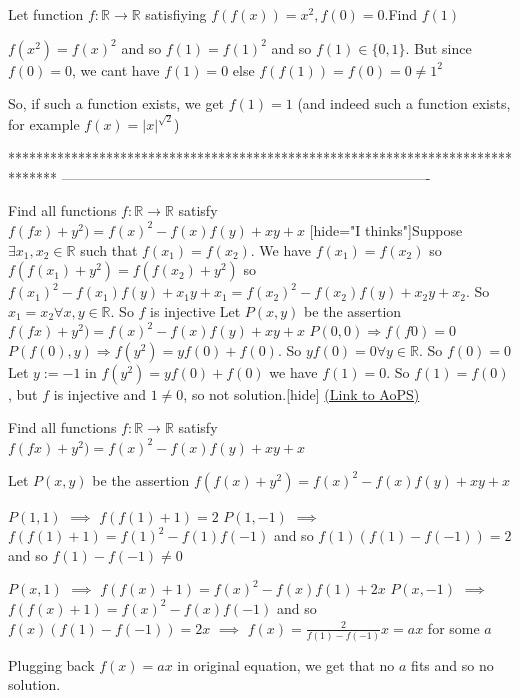 \begin{solution}
	\begin{tcolorbox}Let function $f: \mathbb{R}\to\mathbb{R}$ satisfiying $f(f(x))=x^2,
f(0)=0$.Find $f(1)$\end{tcolorbox}

$f(x^2)=f(x)^2$ and so $f(1)=f(1)^2$ and so $f(1)\in\{0,1\}$. But since $f(0)=0$, we cant have $f(1)=0$ else $f(f(1))=f(0)=0\ne 1^2$

So, if such a function exists, we get $\boxed{f(1)=1}$  (and indeed such a function exists, for example $f(x)=|x|^{\sqrt 2}$)
\end{solution}
*******************************************************************************
-------------------------------------------------------------------------------

\begin{problem}
	Find all functions $f:\mathbb{R}\rightarrow \mathbb{R}$ satisfy
$f(fx)+y^2)=f(x)^2-f(x)f(y)+xy+x$
[hide="I thinks"]Suppose $\exists x_{1}, x_{2}\in \mathbb{R}$ such that $f(x_{1})=f(x_{2})$. 
We have $f(x_{1})=f(x_{2})$ so $f(f(x_{1})+y^2)=f(f(x_{2})+y^2)$ so $f(x_{1})^2- f(x_{1})f(y)+x_{1}y+x_{1}=f(x_{2})^2- f(x_{2})f(y)+x_{2}y+x_{2}$. So $x_{1}=x_{2} \forall x, y\in \mathbb{R}$. So $f$ is injective
Let $P(x,y)$ be the assertion $f(fx)+y^2)=f(x)^2-f(x)f(y)+xy+x$
$P(0,0)\Rightarrow f(f0)=0$
$P(f(0),y)\Rightarrow f(y^2)=yf(0)+f(0)$. So $yf(0)=0\forall  y\in \mathbb{R}$. So $f(0)=0$
Let $y:=-1$ in $f(y^2)=yf(0)+f(0)$ we have $f(1)=0$. So $f(1)=f(0)$, but $f$ is injective and $1\neq 0$, so not solution.[\/hide]
	\flushright \href{https://artofproblemsolving.com/community/c6h458728}{(Link to AoPS)}
\end{problem}



\begin{solution}
	\begin{tcolorbox}Find all functions $f:\mathbb{R}\rightarrow \mathbb{R}$ satisfy
$f(fx)+y^2)=f(x)^2-f(x)f(y)+xy+x$\end{tcolorbox}
Let $P(x,y)$ be the assertion $f(f(x)+y^2)=f(x)^2-f(x)f(y)+xy+x$

$P(1,1)$ $\implies$ $f(f(1)+1)=2$
$P(1,-1)$ $\implies$ $f(f(1)+1)=f(1)^2-f(1)f(-1)$ and so $f(1)(f(1)-f(-1))=2$ and so $f(1)-f(-1)\ne 0$

$P(x,1)$ $\implies$ $f(f(x)+1)=f(x)^2-f(x)f(1)+2x$
$P(x,-1)$ $\implies$ $f(f(x)+1)=f(x)^2-f(x)f(-1)$ and so $f(x)(f(1)-f(-1))=2x$ $\implies$ $f(x)=\frac 2{f(1)-f(-1)}x=ax$ for some $a$

Plugging back $f(x)=ax$ in original equation, we get that no $a$ fits and so no solution.
\end{solution}



